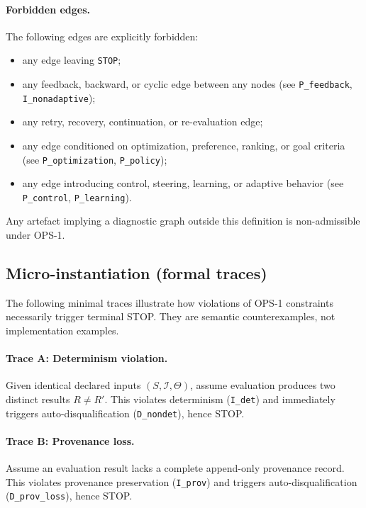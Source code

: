 \paragraph{Forbidden edges.}
The following edges are explicitly forbidden:
\begin{itemize}
  \item any edge leaving \texttt{STOP};
  \item any feedback, backward, or cyclic edge between any nodes
        (see \texttt{P\_feedback}, \texttt{I\_nonadaptive});
  \item any retry, recovery, continuation, or re-evaluation edge;
  \item any edge conditioned on optimization, preference,
        ranking, or goal criteria
        (see \texttt{P\_optimization}, \texttt{P\_policy});
  \item any edge introducing control, steering,
        learning, or adaptive behavior
        (see \texttt{P\_control}, \texttt{P\_learning}).
\end{itemize}

Any artefact implying a diagnostic graph outside this definition is
non-admissible under OPS-1.

\subsection{Micro-instantiation (formal traces)}

The following minimal traces illustrate how violations of OPS-1 constraints
necessarily trigger terminal STOP. They are semantic counterexamples, not
implementation examples.

\paragraph{Trace A: Determinism violation.}
Given identical declared inputs $(S,\mathcal{I},\Theta)$, assume evaluation
produces two distinct results $R \neq R'$.
This violates determinism (\texttt{I\_det}) and immediately triggers
auto-disqualification (\texttt{D\_nondet}), hence STOP.

\paragraph{Trace B: Provenance loss.}
Assume an evaluation result lacks a complete append-only provenance record.
This violates provenance preservation (\texttt{I\_prov}) and triggers
auto-disqualification (\texttt{D\_prov\_loss}), hence STOP.

